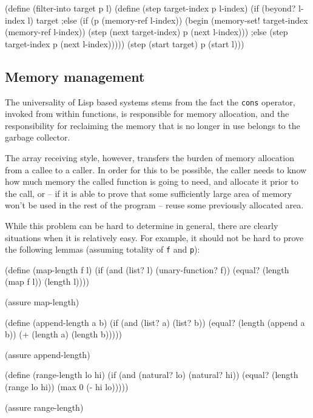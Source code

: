 \begin{Snippet}
(define (filter-into target p l)
  (define (step target-index p l-index)
    (if (beyond? l-index l)
      target
    ;else
      (if (p (memory-ref l-index))
        (begin
          (memory-set! target-index (memory-ref l-index))
          (step (next target-index) p (next l-index)))
      ;else
        (step target-index p (next l-index)))))
  (step (start target) p (start l)))
\end{Snippet}

\subsection{Memory management}

The universality of Lisp based systems stems from the fact the
\texttt{cons} operator, invoked from within functions, is responsible
for memory allocation, and the responsibility for reclaiming
the memory that is no longer in use belongs to the garbage
collector.

The array receiving style, however, transfers the burden of memory
allocation from a callee to a caller. In order for this to be possible,
the caller needs to know how much memory the called function is going
to need, and allocate it prior to the call, or -- if it is able to
prove that some sufficiently large area of memory won't be used in
the rest of the program -- reuse some previously allocated area.

While this problem can be hard to determine in general, there are
clearly situations when it is relatively easy. For example,
it should not be hard to prove the following lemmas
(assuming totality of \texttt{f} and \texttt{p}):

\begin{Snippet}
  (define (map-length f l)
    (if (and (list? l) (unary-function? f))
      (equal? (length (map f l))
              (length l))))

  (assure map-length)
\end{Snippet}
\begin{Snippet}
  (define (append-length a b)
    (if (and (list? a) (list? b))
      (equal? (length (append a b))
              (+ (length a) (length b)))))

  (assure append-length)
\end{Snippet}
\begin{Snippet}
  (define (range-length lo hi)
    (if (and (natural? lo) (natural? hi))
      (equal? (length (range lo hi))
              (max 0 (- hi lo)))))

  (assure range-length)
\end{Snippet}

